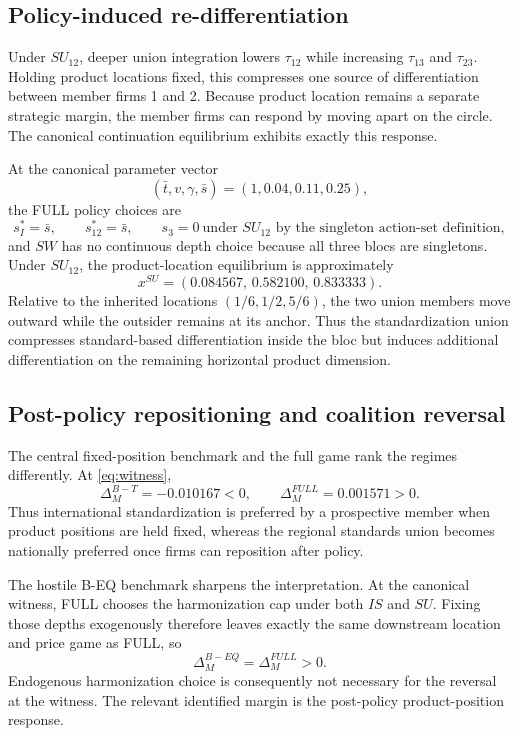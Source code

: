 \subsection{Policy-induced re-differentiation}

Under $SU_{12}$, deeper union integration lowers $\tau_{12}$ while increasing $\tau_{13}$ and $\tau_{23}$. Holding product locations fixed, this compresses one source of differentiation between member firms 1 and 2. Because product location remains a separate strategic margin, the member firms can respond by moving apart on the circle. The canonical continuation equilibrium exhibits exactly this response.

At the canonical parameter vector
\begin{equation}\label{eq:witness}
(\bar t,v,\gamma,\bar s)=(1,0.04,0.11,0.25),
\end{equation}
the FULL policy choices are
\[
s_I^*=\bar s,
\qquad
s_{12}^*=\bar s,
\qquad
s_3=0\ \text{under }SU_{12}\text{ by the singleton action-set definition},
\]
and $SW$ has no continuous depth choice because all three blocs are singletons. Under $SU_{12}$, the product-location equilibrium is approximately
\[
x^{SU}=(0.084567,\,0.582100,\,0.833333).
\]
Relative to the inherited locations $(1/6,1/2,5/6)$, the two union members move outward while the outsider remains at its anchor. Thus the standardization union compresses standard-based differentiation inside the bloc but induces additional differentiation on the remaining horizontal product dimension.

\subsection{Post-policy repositioning and coalition reversal}

The central fixed-position benchmark and the full game rank the regimes differently. At \eqref{eq:witness},
\[
\Delta_M^{B-T}=-0.010167<0,
\qquad
\Delta_M^{FULL}=0.001571>0.
\]
Thus international standardization is preferred by a prospective member when product positions are held fixed, whereas the regional standards union becomes nationally preferred once firms can reposition after policy.

The hostile B-EQ benchmark sharpens the interpretation. At the canonical witness, FULL chooses the harmonization cap under both $IS$ and $SU$. Fixing those depths exogenously therefore leaves exactly the same downstream location and price game as FULL, so
\[
\Delta_M^{B-EQ}=\Delta_M^{FULL}>0.
\]
Endogenous harmonization choice is consequently not necessary for the reversal at the witness. The relevant identified margin is the post-policy product-position response.

